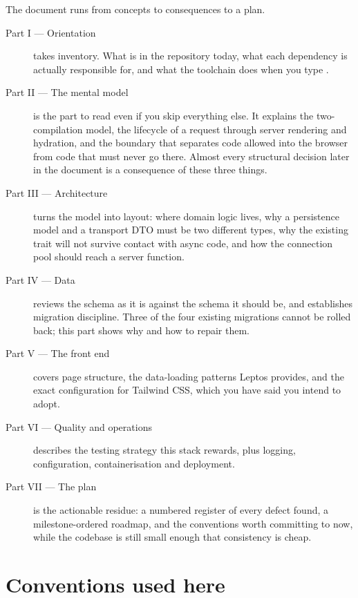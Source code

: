 The document runs from concepts to consequences to a plan.

\begin{description}
  \item[Part I --- Orientation] takes inventory. What is in the repository today, what
    each dependency is actually responsible for, and what the toolchain does when you type
    .

  \item[Part II --- The mental model] is the part to read even if you skip everything else.
    It explains the two-compilation model, the lifecycle of a request through server rendering
    and hydration, and the boundary that separates code allowed into the browser from code that
    must never go there. Almost every structural decision later in the document is a consequence
    of these three things.

  \item[Part III --- Architecture] turns the model into layout: where domain logic lives, why a
    persistence model and a transport DTO must be two different types, why the existing
     trait will not survive contact with async code, and how the connection
    pool should reach a server function.

  \item[Part IV --- Data] reviews the schema as it is against the schema it should be, and
    establishes migration discipline. Three of the four existing migrations cannot be rolled
    back; this part shows why and how to repair them.

  \item[Part V --- The front end] covers page structure, the data-loading patterns Leptos
    provides, and the exact configuration for Tailwind CSS, which you have said you intend to adopt.

  \item[Part VI --- Quality and operations] describes the testing strategy this stack rewards,
    plus logging, configuration, containerisation and deployment.

  \item[Part VII --- The plan] is the actionable residue: a numbered register of every defect
    found, a milestone-ordered roadmap, and the conventions worth committing to now, while the
    codebase is still small enough that consistency is cheap.
\end{description}

\section{Conventions used here}

